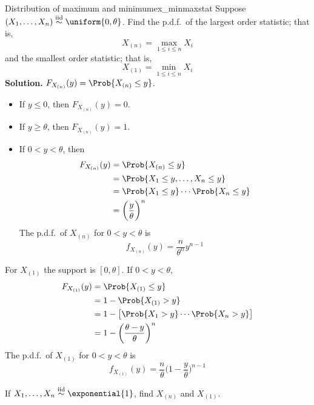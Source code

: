 \begin{Example}{Distribution of maximum and minimum}{ex_minmaxstat}
    Suppose $ (X_1,\ldots,X_n)\stackrel{\text{iid}}{\sim}\uniform{0,\theta} $.
    Find the p.d.f.\ of the largest order statistic; that is,
    \[ X_{(n)}=\max_{1\le i\le n} X_i \]
    and the smallest order statistic; that is,
    \[ X_{(1)}=\min_{1\le i\le n}X_i \]
    \textbf{Solution.} $ F_{X_{(n)}}(y)=\Prob{X_{(n)}\le y} $.
    \begin{itemize}
        \item If $ y\le 0 $, then $ F_{X_{(n)}}(y)=0 $.
        \item If $ y\ge \theta $, then $ F_{X_{(n)}}(y)=1 $.
        \item If $ 0<y<\theta $, then
              \begin{align*}
                  F_{X_{(n)}}(y)
                   & =\Prob{X_{(n)}\le y}                  \\
                   & =\Prob{X_1\le y,\ldots,X_n\le y}      \\
                   & =\Prob{X_1\le y}\cdots\Prob{X_n\le y} \\
                   & =\biggl( \frac{y}{\theta} \biggr)^n
              \end{align*}
              The p.d.f.\ of $ X_{(n)} $ for $ 0<y<\theta $ is
              \[ f_{X_{(n)}}(y)=\frac{n}{\theta^n}y^{n-1} \]
    \end{itemize}
    For $ X_{(1)} $ the support is $ [0,\theta] $. If $ 0<y<\theta $,
    \begin{align*}
        F_{X_{(1)}}(y)
         & =\Prob{X_{(1)}\le y}                             \\
         & =1-\Prob{X_{(1)}>y}                              \\
         & =1-\bigl[ \Prob{X_1>y}\cdots \Prob{X_n>y} \bigr] \\
         & =1-\biggl( \frac{\theta-y}{\theta}  \biggr)^n
    \end{align*}
    The p.d.f.\ of $ X_{(1)} $ for $ 0<y<\theta $ is
    \[ f_{X_{(1)}}(y)=\frac{n}{\theta} \biggl( 1-\frac{y}{\theta}  \biggr)^{n-1} \]
\end{Example}
\begin{Exercise}{}{}
    If $ X_1,\ldots,X_n \stackrel{\text{iid}}{\sim} \exponential{1} $,
    find $ X_{(n)} $ and $ X_{(1)} $.
\end{Exercise}
